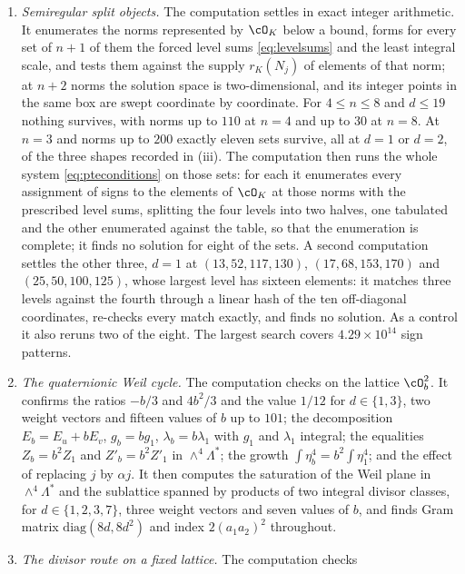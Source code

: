 \begin{enumerate}[label=\textup{(\Roman*)},leftmargin=*]
\item \emph{Semiregular split objects.} The computation settles
   in exact integer arithmetic. It enumerates the norms
  represented by $\cO_{K}$ below a bound, forms for every set of $n+1$ of them
  the forced level sums \eqref{eq:levelsums} and the least integral scale,
  and tests them against the supply $r_{K}(N_{j})$ of elements of that norm;
  at $n+2$ norms the solution space is two-dimensional, and its integer
  points in the same box are swept coordinate by coordinate. For $4\le n\le8$
  and $d\le19$ nothing survives, with norms up to $110$ at $n=4$ and up to
  $30$ at $n=8$. At $n=3$ and norms up to $200$ exactly eleven sets survive,
  all at $d=1$ or $d=2$, of the three shapes recorded in
  (iii). The computation then runs the whole system
  \eqref{eq:pteconditions} on those sets: for each it enumerates every
  assignment of signs to the elements of $\cO_{K}$ at those norms with the
  prescribed level sums, splitting the four levels into two halves, one
  tabulated and the other enumerated against the table, so that the
  enumeration is complete; it finds no solution for eight of the sets. A
  second computation settles the other three, $d=1$ at $(13,52,117,130)$,
  $(17,68,153,170)$ and $(25,50,100,125)$, whose largest level has sixteen
  elements: it matches three levels against the fourth through a linear hash
  of the ten off-diagonal coordinates, re-checks every match exactly, and
  finds no solution. As a control it also reruns two of the eight. The
  largest search covers $4.29\times10^{14}$ sign patterns.
\item \emph{The quaternionic Weil cycle.} The computation checks
   on the lattice $\cO_{b}^{2}$. It confirms the
  ratios $-b/3$ and $4b^{2}/3$ and the value $1/12$ for $d\in\{1,3\}$, two
  weight vectors and fifteen values of $b$ up to $101$; the decomposition
  $E_{b}=E_{u}+bE_{v}$, $g_{b}=bg_{1}$, $\lambda_{b}=b\lambda_{1}$ with $g_{1}$
  and $\lambda_{1}$ integral; the equalities $Z_{b}=b^{2}Z_{1}$ and
  $Z'_{b}=b^{2}Z'_{1}$ in $\wedge^{4}\Lambda^{*}$; the growth
  $\int\eta_{b}^{4}=b^{2}\int\eta_{1}^{4}$; and the effect of replacing $j$ by
  $\alpha j$. It then computes the saturation of the Weil plane in
  $\wedge^{4}\Lambda^{*}$ and the sublattice spanned by products of two
  integral divisor classes, for $d\in\{1,2,3,7\}$, three weight vectors and
  seven values of $b$, and finds Gram matrix $\mathrm{diag}(8d,8d^{2})$ and
  index $2(a_{1}a_{2})^{2}$ throughout.
\item \emph{The divisor route on a fixed lattice.} The computation checks

\end{enumerate}
